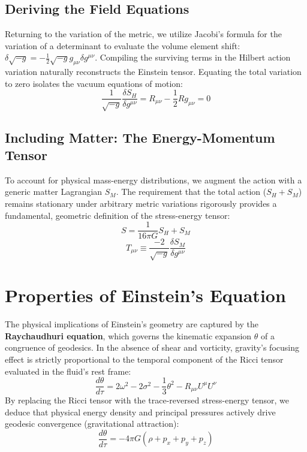\documentclass[11pt, a4paper]{report}
\begin{document}
\subsection{Deriving the Field Equations}
Returning to the variation of the metric, we utilize Jacobi's formula for the variation of a determinant to evaluate the volume element shift: $\delta \sqrt{-g} = -\frac{1}{2} \sqrt{-g} g_{\mu\nu} \delta g^{\mu\nu}$. Compiling the surviving terms in the Hilbert action variation naturally reconstructs the Einstein tensor. Equating the total variation to zero isolates the vacuum equations of motion:
\begin{equation}
\frac{1}{\sqrt{-g}} \frac{\delta S_{H}}{\delta g^{\mu\nu}} = R_{\mu\nu} - \frac{1}{2}R g_{\mu\nu} = 0
\end{equation}

\subsection{Including Matter: The Energy-Momentum Tensor}
To account for physical mass-energy distributions, we augment the action with a generic matter Lagrangian $S_M$. The requirement that the total action ($S_H + S_M$) remains stationary under arbitrary metric variations rigorously provides a fundamental, geometric definition of the stress-energy tensor:
\begin{equation}
\label{eq:total_action}
S = \frac{1}{16\pi G} S_{H} + S_{M}
\end{equation}
\begin{equation}
\label{eq:hilbert_stress_energy}
T_{\mu\nu} \equiv \frac{-2}{\sqrt{-g}} \frac{\delta S_{M}}{\delta g^{\mu\nu}}
\end{equation}

\section{Properties of Einstein's Equation}
The physical implications of Einstein's geometry are captured by the \textbf{Raychaudhuri equation}, which governs the kinematic expansion $\theta$ of a congruence of geodesics. In the absence of shear and vorticity, gravity's focusing effect is strictly proportional to the temporal component of the Ricci tensor evaluated in the fluid's rest frame:
\begin{equation}
\label{eq:raychaudhuri}
\frac{d\theta}{d\tau} = 2\omega^{2} - 2\sigma^{2} - \frac{1}{3}\theta^{2} - R_{\mu\nu}U^{\mu}U^{\nu}
\end{equation}
By replacing the Ricci tensor with the trace-reversed stress-energy tensor, we deduce that physical energy density and principal pressures actively drive geodesic convergence (gravitational attraction):
\begin{equation}
\label{eq:expansion_gravity}
\frac{d\theta}{d\tau} = -4\pi G (\rho + p_{x} + p_{y} + p_{z})
\end{equation}
\end{document}
